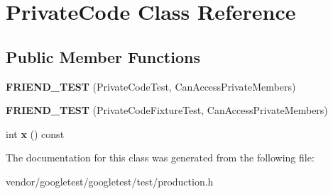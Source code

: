 \hypertarget{classPrivateCode}{}\section{Private\+Code Class Reference}
\label{classPrivateCode}
\subsection*{Public Member Functions}
\begin{DoxyCompactItemize}
\item 
{\bfseries F\+R\+I\+E\+N\+D\+\_\+\+T\+E\+ST} (Private\+Code\+Test, Can\+Access\+Private\+Members)\hypertarget{classPrivateCode_a9a74a333501232539ab1636f0928d8f2}{}\label{classPrivateCode_a9a74a333501232539ab1636f0928d8f2}

\item 
{\bfseries F\+R\+I\+E\+N\+D\+\_\+\+T\+E\+ST} (Private\+Code\+Fixture\+Test, Can\+Access\+Private\+Members)\hypertarget{classPrivateCode_a29b6823300f68d78691476eeeaed8a7c}{}\label{classPrivateCode_a29b6823300f68d78691476eeeaed8a7c}

\item 
int {\bfseries x} () const \hypertarget{classPrivateCode_a498ca4a1f33008f20569823125222d55}{}\label{classPrivateCode_a498ca4a1f33008f20569823125222d55}

\end{DoxyCompactItemize}


The documentation for this class was generated from the following file\+:\begin{DoxyCompactItemize}
\item 
vendor/googletest/googletest/test/production.\+h\end{DoxyCompactItemize}

